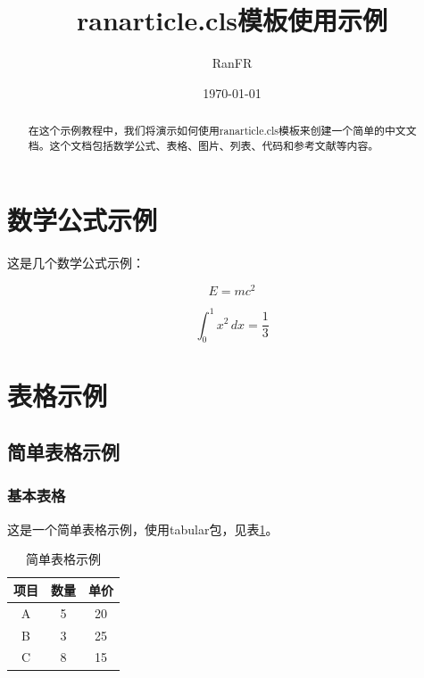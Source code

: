 \documentclass{ranarticle}
\title{ranarticle.cls模板使用示例}
\author{RanFR}
\date{\today}
\begin{document}
\maketitle

\begin{abstract}
    在这个示例教程中，我们将演示如何使用ranarticle.cls模板来创建一个简单的中文文档。这个文档包括数学公式、表格、图片、列表、代码和参考文献等内容。
\end{abstract}

\section{数学公式示例}

这是几个数学公式示例：

\begin{equation}
    E = mc^2
\end{equation}

\begin{equation}
    \int_0^1 x^2 \, dx = \frac{1}{3}
\end{equation}

\section{表格示例}

\subsection{简单表格示例}

\subsubsection{基本表格}

这是一个简单表格示例，使用tabular包，见表\ref{tab:basic_tabular_table}。

\begin{table}[htbp]
    \centering
    \caption{简单表格示例}
    \label{tab:basic_tabular_table}
    \begin{tabular}{|c|c|c|}
        \hline
        项目 & 数量 & 单价 \\
        \hline
        A    & 5    & 20   \\
        B    & 3    & 25   \\
        C    & 8    & 15   \\
        \hline
    \end{tabular}
\end{table}
\end{document}
